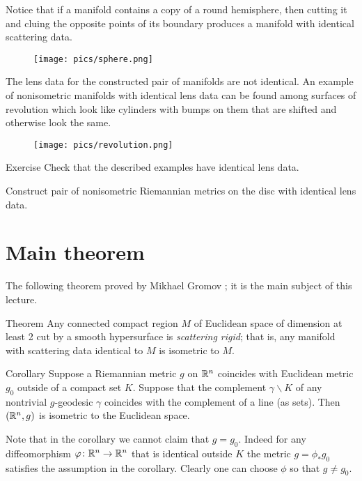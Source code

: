 Notice that if a manifold contains a copy of a round hemisphere, then cutting it and cluing the opposite points of its boundary produces a manifold with identical scattering data.
\begin{figure}[h!]
\centering
\texttt{[image: pics/sphere.png]}
\end{figure}
The lens data for the constructed pair of manifolds are not identical.
An example of nonisometric manifolds with identical lens data can be found among surfaces of revolution which look like cylinders with bumps on them that are shifted and otherwise look the same.
\begin{figure}[h!]
\centering
\texttt{[image: pics/revolution.png]}
\end{figure}

\begin{thm}{Exercise}
Check that the described examples have identical lens data.

Construct pair of nonisometric Riemannian metrics on the disc with identical lens data.
\end{thm}

\section{Main theorem}

The following theorem proved by Mikhael Gromov \cite{gromov-1983};
it is the main subject of this lecture.

\begin{thm}{Theorem}\label{thm:magic-cloak}
Any connected compact region $M$ of Euclidean space of dimension at least 2 cut by a smooth hypersurface is \emph{scattering rigid};
that is, any manifold with scattering data identical to $M$ is isometric to $M$.
\end{thm}

\begin{thm}{Corollary}
Suppose a Riemannian metric $g$ on $\mathbb{R}^n$ coincides with Euclidean metric $g_0$ outside of a compact set $K$.
Suppose that the complement $\gamma\backslash K$ of any nontrivial $g$-geodesic $\gamma$ coincides with the complement of a line (as sets).
Then $(\mathbb{R}^n,g)$ is isometric to the Euclidean space.
\end{thm}

Note that in the corollary we cannot claim that $g=g_0$.
Indeed for any diffeomorphism $\varphi\colon\mathbb{R}^n\to\mathbb{R}^n$ that is identical outside $K$ the metric $g=\phi_*g_0$ satisfies the assumption in the corollary.
Clearly one can choose $\phi$ so that $g\ne g_0$.



